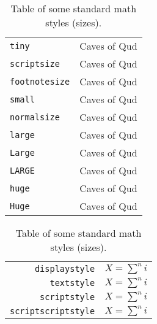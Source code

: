 \def\test{Caves of Qud}
\def\testM{X = \sum^n i}
\begin{table}[H]
	\centering
	\caption{Tables showing text- and math mode sizes.}
	\label{tab:sizes}
	\renewcommand{\arraystretch}{1.25}
	\begin{subtable}[h]{0.75\textwidth}
		\centering
		\begin{tabular}{| m{} | m{} |}
		\hline
		\texttt{tiny} & {\tiny\test} \\
		\texttt{scriptsize} & {\scriptsize\test} \\
		\texttt{footnotesize} & {\footnotesize\test} \\
		\texttt{small} & {\small\test} \\
		\texttt{normalsize} & {\normalsize\test} \\
		\texttt{large} & {\large\test} \\
		\texttt{Large} & {\Large\test} \\
		\texttt{LARGE} & {\LARGE\test} \\
		\texttt{huge} & {\huge\test} \\
		\texttt{Huge} & {\Huge\test} \\
		\hline
		\end{tabular}
		\caption{Table of some standard text sizes.}
		\label{tab:textsizes}
	\end{subtable}
	
	\vspace{2mm}
	\setlength{\tabcolsep}{22pt}
	
	\begin{subtable}[h]{0.75\textwidth}
		\centering
		\begin{tabular}{||r|c||}
		\hline
		\texttt{displaystyle} & $\displaystyle\testM$ \\
		\texttt{textstyle} & $\textstyle\testM$ \\
		\texttt{scriptstyle} & $\scriptstyle\testM$ \\
		\texttt{scriptscriptstyle} & $\scriptscriptstyle\testM$ \\
		\hline
		\end{tabular}
		\caption{Table of some standard math styles (sizes).}
		\label{tab:mathsizes}
	\end{subtable}
\end{table}

